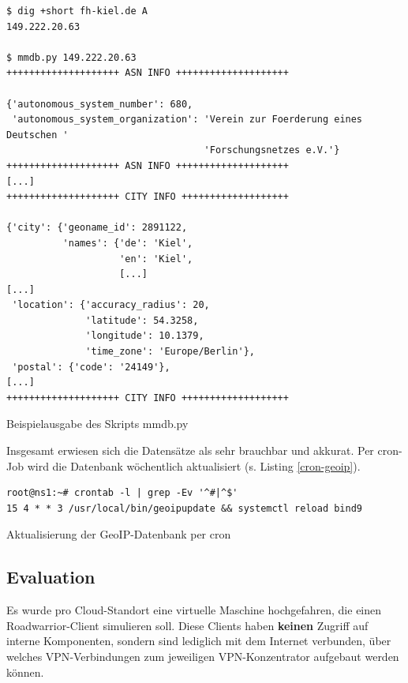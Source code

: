 \begin{listing}[h]
\begin{verbatim}
$ dig +short fh-kiel.de A
149.222.20.63

$ mmdb.py 149.222.20.63
++++++++++++++++++++ ASN INFO ++++++++++++++++++++

{'autonomous_system_number': 680,
 'autonomous_system_organization': 'Verein zur Foerderung eines Deutschen '
                                   'Forschungsnetzes e.V.'}
++++++++++++++++++++ ASN INFO ++++++++++++++++++++
[...]
++++++++++++++++++++ CITY INFO +++++++++++++++++++

{'city': {'geoname_id': 2891122,
          'names': {'de': 'Kiel',
                    'en': 'Kiel',
                    [...]
[...]
 'location': {'accuracy_radius': 20,
              'latitude': 54.3258,
              'longitude': 10.1379,
              'time_zone': 'Europe/Berlin'},
 'postal': {'code': '24149'},
[...]
++++++++++++++++++++ CITY INFO +++++++++++++++++++
\end{verbatim}
\caption{Beispielausgabe des Skripts mmdb.py}
\label{mmdb-example}
\end{listing}\FloatBarrier
Insgesamt erwiesen sich die Datensätze als sehr brauchbar und akkurat. Per cron-Job wird die Datenbank wöchentlich aktualisiert (s. Listing \ref{cron-geoip}).
\begin{listing}[h]
\begin{verbatim}
root@ns1:~# crontab -l | grep -Ev '^#|^$'
15 4 * * 3 /usr/local/bin/geoipupdate && systemctl reload bind9

\end{verbatim}
\caption{Aktualisierung der GeoIP-Datenbank per cron}
\label{cron-geoip}
\end{listing}\FloatBarrier

\newpage
\subsection{Evaluation}

Es wurde pro Cloud-Standort eine virtuelle Maschine hochgefahren, die einen \gls{Roadwarrior}-\gls{Client} simulieren soll. Diese \gls{Client}s haben \textbf{keinen} Zugriff auf interne Komponenten, sondern sind lediglich mit dem Internet verbunden, über welches \gls{VPN}-Verbindungen zum jeweiligen \gls{VPN-Konzentrator} aufgebaut werden können.

